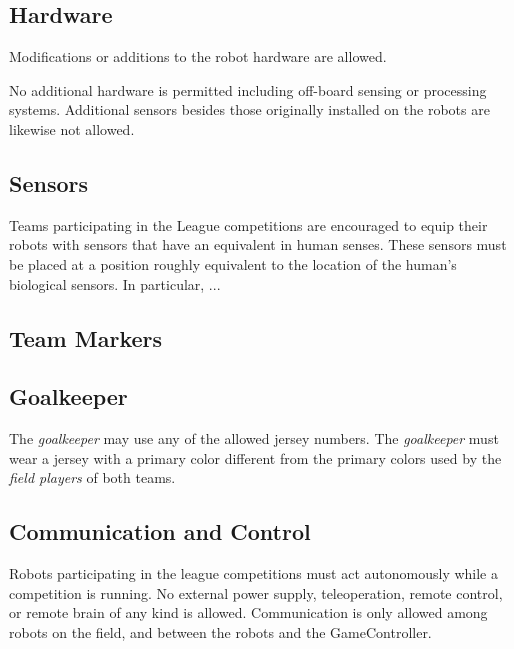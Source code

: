 
\label{sec:design_of_robots}

\subsection{Hardware}
\label{sec:hardware}


Modifications or additions to the robot hardware are allowed.

No additional hardware is permitted including off-board sensing or processing systems.
Additional sensors besides those originally installed on the robots are likewise not allowed.

\subsection{Sensors}
\label{sec:sensors}

Teams participating in the \leaguenameabbr League competitions are encouraged to equip their robots with sensors that have an equivalent in human senses. 
These sensors must be placed at a position roughly equivalent to the location of the human{\textquoteright}s biological sensors. In particular, ...

\subsection{Team Markers}
\label{sec:team_markers}


\subsection{Goalkeeper}
\label{sec:goalkeeper}

The \emph{goalkeeper} may use any of the allowed jersey numbers.
The \emph{goalkeeper} must wear a jersey with a primary color different from the primary colors used by the \emph{field players} of both teams.

\subsection{Communication and Control}

Robots participating in the \leaguenameabbr league competitions must act autonomously while a competition is running. No external power supply, teleoperation, remote control, or remote brain of any kind is allowed.
Communication is only allowed among robots on the field,  and between the robots and the GameController.

